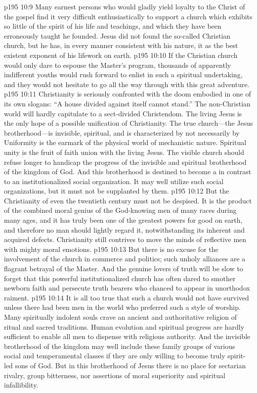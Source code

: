 \vs p195 10:9 Many earnest persons who would gladly yield loyalty to the Christ of the gospel find it very difficult enthusiastically to support a church which exhibits so little of the spirit of his life and teachings, and which they have been erroneously taught he founded. Jesus did not found the so\hyp{}called Christian church, but he has, in every manner consistent with his nature,  it as the best existent exponent of his lifework on earth.
\vs p195 10:10 If the Christian church would only dare to espouse the Master’s program, thousands of apparently indifferent youths would rush forward to enlist in such a spiritual undertaking, and they would not hesitate to go all the way through with this great adventure.
\vs p195 10:11 Christianity is seriously confronted with the doom embodied in one of its own slogans: “A house divided against itself cannot stand.” The non\hyp{}Christian world will hardly capitulate to a sect\hyp{}divided Christendom. The living Jesus is the only hope of a possible unification of Christianity. The true church---the Jesus brotherhood---is invisible, spiritual, and is characterized by  not necessarily by  Uniformity is the earmark of the physical world of mechanistic nature. Spiritual unity is the fruit of faith union with the living Jesus. The visible church should refuse longer to handicap the progress of the invisible and spiritual brotherhood of the kingdom of God. And this brotherhood is destined to become a  in contrast to an institutionalized social organization. It may well utilize such social organizations, but it must not be supplanted by them.
\vs p195 10:12 But the Christianity of even the twentieth century must not be despised. It is the product of the combined moral genius of the God\hyp{}knowing men of many races during many ages, and it has truly been one of the greatest powers for good on earth, and therefore no man should lightly regard it, notwithstanding its inherent and acquired defects. Christianity still contrives to move the minds of reflective men with mighty moral emotions.
\vs p195 10:13 But there is no excuse for the involvement of the church in commerce and politics; such unholy alliances are a flagrant betrayal of the Master. And the genuine lovers of truth will be slow to forget that this powerful institutionalized church has often dared to smother newborn faith and persecute truth bearers who chanced to appear in unorthodox raiment.
\vs p195 10:14 It is all too true that such a church would not have survived unless there had been men in the world who preferred such a style of worship. Many spiritually indolent souls crave an ancient and authoritative religion of ritual and sacred traditions. Human evolution and spiritual progress are hardly sufficient to enable all men to dispense with religious authority. And the invisible brotherhood of the kingdom may well include these family groups of various social and temperamental classes if they are only willing to become truly spirit\hyp{}led sons of God. But in this brotherhood of Jesus there is no place for sectarian rivalry, group bitterness, nor assertions of moral superiority and spiritual infallibility.

